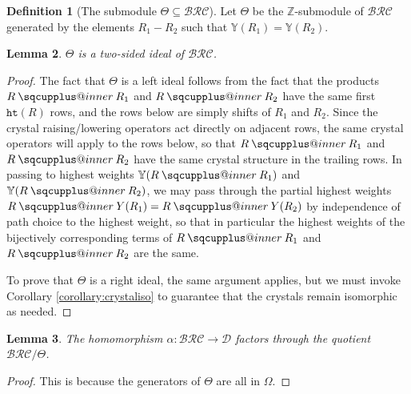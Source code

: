 \documentclass{amsart}
\makeatletter
\newcommand{\sqcupplus@inner}[2]{%
  \vcenter{\hbox{\ooalign{%
    \hfil$\m@th#1\sqcup$\hfil\cr
    \hfil\raisebox{0.15ex}{$\m@th#1\scriptscriptstyle+$}\hfil\cr
  }}}%
}
\newcommand{\sqcupplus}{\mathbin{\mathpalette\sqcupplus@inner\relax}}
\newtheorem{lemma}{Lemma}[subsection]
\newtheorem{proposition}[lemma]{Proposition}
\theoremstyle{definition}
\newtheorem{definition}[lemma]{Definition}
\theoremstyle{remark}
\numberwithin{equation}{subsection}
\newcommand{\wtt}{\mathtt{wt}}
\newcommand{\hr}{\mathtt{ht}}
\newcommand{\BRC}{\mathcal{BRC}}
\newcommand{\RC}{\mathcal{RC}}
\newcommand{\dcoma}{\mathcal{D}}
\makeatother
\begin{document}

\begin{definition}[The submodule $\Theta\subseteq \BRC$]\label{definition:theta}
  Let $\Theta$ be the $\mathbb{Z}$-submodule of $\BRC$ generated by the elements $R_1-R_2$ such that $\mathbb{Y}(R_1)=\mathbb{Y}(R_2)$.

\end{definition}

\begin{lemma}
  $\Theta$ is a two-sided ideal of $\BRC$.
\end{lemma}
\begin{proof}
  The fact that $\Theta$ is a left ideal follows from the fact that the products $R\sqcupplus R_1$ and $R\sqcupplus R_2$ have the same first $\hr(R)$ rows, and the rows below are simply shifts of $R_1$ and $R_2$. Since the crystal raising/lowering operators act directly on adjacent rows, the same crystal operators will apply to the rows below, so that $R\sqcupplus R_1$ and $R\sqcupplus R_2$ have the same crystal structure in the trailing rows. In passing to highest weights $\mathbb{Y}(R\sqcupplus R_1)$ and $\mathbb{Y}(R\sqcupplus R_2)$, we may pass through the partial highest weights $R\sqcupplus Y(R_1) = R\sqcupplus Y(R_2)$ by independence of path choice to the highest weight, so that in particular the highest weights of the bijectively corresponding terms of $R\sqcupplus R_1$ and $R\sqcupplus R_2$ are the same.
  

  To prove that $\Theta$ is a right ideal, the same argument applies, but we must invoke Corollary \ref{corollary:crystaliso} to guarantee that the crystals remain isomorphic as needed.
\end{proof}

\begin{lemma}
  The homomorphism $\alpha:\BRC\to\dcoma$ factors through the quotient $\BRC/\Theta$.
\end{lemma}
\begin{proof}
This is because the generators of $\Theta$ are all in $\Omega$.
\end{proof}
\end{document}
